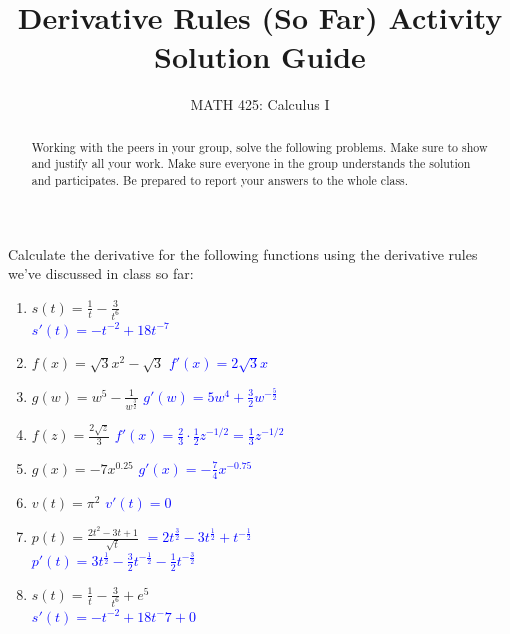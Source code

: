 \documentclass{ximera}
\title{Derivative Rules (So Far) Activity Solution Guide}
\author{MATH 425: Calculus I}
\begin{document}
\begin{abstract}
    Working with the peers in your group, solve the following problems. Make sure to show and justify all your work. Make sure everyone in the group understands the solution and participates. Be prepared to report your answers to the whole class. 
\end{abstract}
\maketitle


\begin{exercise}
Calculate the derivative for the following functions using the derivative rules we've discussed in class so far: 
\begin{enumerate}
    \item $s(t)=\frac{1}{t}-\frac{3}{t^6}$\\
    \textcolor{blue}{$s'(t)=-t^{-2}+18t^{-7}$}

    \item $f(x)=\sqrt{3}x^2-\sqrt{3}$
    \textcolor{blue}{ $f'(x)=2\sqrt{3}x$}
    
    \item $g(w)=w^5-\frac{1}{w^\frac{3}{2}}$
    \textcolor{blue}{ $g'(w)=5w^4+\frac{3}{2}w^{-\frac{5}{2}}$}
    
    \item $f(z)=\frac{2\sqrt{z}}{3}$ 
    \textcolor{blue}{ $f'(x)= \frac{2}{3}\cdot \frac12 z^{-1/2}=\frac13 z^{-1/2}$}
    
    \item $g(x)=-7x^{0.25}$
    \textcolor{blue}{ $g'(x)=-\frac{7}{4}x^{-0.75}$}
    
    \item $v(t)=\pi^2$
    \textcolor{blue}{ $v'(t)=0$}
    
    \item $p(t)=\frac{2t^2-3t+1}{\sqrt{t}}$ \textcolor{blue}{ $=2t^{\frac32}-3t^{\frac12}+t^{-\frac12}$}\\
    \textcolor{blue}{ $p'(t)=3t^{\frac12}-\frac32 t^{-\frac12}-\frac12t^{-\frac32}$}

    \item $s(t)=\frac{1}{t}-\frac{3}{t^6}+e^5$\\
    \textcolor{blue}{ $s'(t)=-t^{-2}+18t^-7+0$}
\end{enumerate}
\end{exercise}
\end{document}
